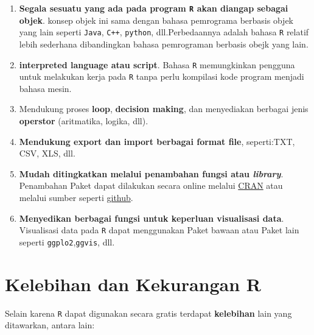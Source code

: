 \documentclass[]{book}
\providecommand{\tightlist}{%
  \setlength{\itemsep}{0pt}\setlength{\parskip}{0pt}}
\theoremstyle{definition}
\theoremstyle{definition}
\theoremstyle{definition}
\theoremstyle{remark}
\begin{document}
\begin{enumerate}
\def\labelenumi{\arabic{enumi}.}
\setcounter{enumi}{1}
\tightlist
\item
  \textbf{Segala sesuatu yang ada pada program \texttt{R} akan diangap sebagai objek}. konsep objek ini sama dengan bahasa pemrograma berbasis objek yang lain seperti \texttt{Java}, \texttt{C++}, \texttt{python}, dll.Perbedaannya adalah bahasa \texttt{R} relatif lebih sederhana dibandingkan bahasa pemrograman berbasis obejk yang lain.
\item
  \textbf{interpreted language atau script}. Bahasa \texttt{R} memungkinkan pengguna untuk melakukan kerja pada \texttt{R} tanpa perlu kompilasi kode program menjadi bahasa mesin.
\item
  Mendukung proses \textbf{loop}, \textbf{decision making}, dan menyediakan berbagai jenis \textbf{operstor} (aritmatika, logika, dll).
\item
  \textbf{Mendukung export dan import berbagai format file}, seperti:TXT, CSV, XLS, dll.
\item
  \textbf{Mudah ditingkatkan melalui penambahan fungsi atau \emph{library}}. Penambahan Paket dapat dilakukan secara online melalui \href{https://cran.r-project.org/}{CRAN} atau melalui sumber seperti \href{https://github.com/}{github}.
\item
  \textbf{Menyedikan berbagai fungsi untuk keperluan visualisasi data}. Visualisasi data pada \texttt{R} dapat menggunakan Paket bawaan atau Paket lain seperti \texttt{ggplo2},\texttt{ggvis}, dll.
\end{enumerate}

\hypertarget{prosconsR}{%
\section{Kelebihan dan Kekurangan R}\label{prosconsR}}

Selain karena \texttt{R} dapat digunakan secara gratis terdapat \textbf{kelebihan} lain yang ditawarkan, antara lain:
\end{document}
